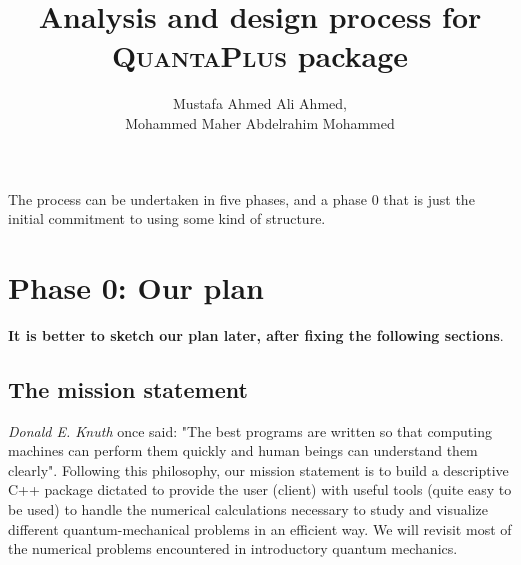 \documentclass[10pt,a4paper]{article}
\begin{document}
\title{Analysis and design process for \textsc{QuantaPlus} package}	
\author{Mustafa Ahmed Ali Ahmed,\\ Mohammed Maher Abdelrahim Mohammed}
\maketitle
The process can be undertaken in five phases, and a phase 0 that is
just the initial commitment to using some kind of structure.
\section{Phase 0: Our plan}
\textbf{It is better to sketch our plan later, after fixing the following sections}. 
\subsection{The mission statement} 
\textit{Donald E. Knuth} once said: "The best programs are written so that computing machines can perform them quickly and human beings can understand them clearly". Following this philosophy, our mission statement is to build a descriptive C++ package dictated to provide the user (client) with useful tools (quite easy to be used) to handle the numerical calculations necessary to study and visualize different quantum-mechanical problems in an efficient way. We will revisit most of the numerical problems encountered in introductory quantum mechanics.
\end{document}
